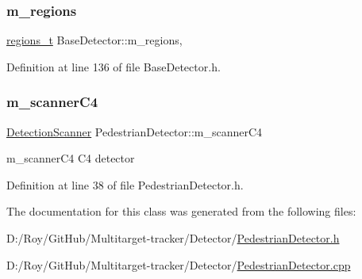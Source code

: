 \subsubsection{\texorpdfstring{m\+\_\+regions}{m\_regions}}
{\footnotesize\ttfamily \mbox{\hyperlink{defines_8h_a01db0de56a20f4342820a093c5154536}{regions\+\_\+t}} Base\+Detector\+::m\+\_\+regions\hspace{0.3cm}{\ttfamily [protected]}, {\ttfamily [inherited]}}



Definition at line 136 of file Base\+Detector.\+h.

\mbox{\label{class_pedestrian_detector_a68a45a369623a3492065bdf29e81b29c}} 
\subsubsection{\texorpdfstring{m\+\_\+scanner\+C4}{m\_scannerC4}}
{\footnotesize\ttfamily \mbox{\hyperlink{class_detection_scanner}{Detection\+Scanner}} Pedestrian\+Detector\+::m\+\_\+scanner\+C4\hspace{0.3cm}{\ttfamily [private]}}



m\+\_\+scanner\+C4 C4 detector 



Definition at line 38 of file Pedestrian\+Detector.\+h.



The documentation for this class was generated from the following files\+:\begin{DoxyCompactItemize}
\item 
D\+:/\+Roy/\+Git\+Hub/\+Multitarget-\/tracker/\+Detector/\mbox{\hyperlink{_pedestrian_detector_8h}{Pedestrian\+Detector.\+h}}\item 
D\+:/\+Roy/\+Git\+Hub/\+Multitarget-\/tracker/\+Detector/\mbox{\hyperlink{_pedestrian_detector_8cpp}{Pedestrian\+Detector.\+cpp}}\end{DoxyCompactItemize}
